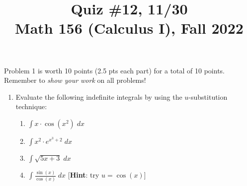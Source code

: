 \documentclass[11pt]{article}
\title{Quiz \#12, 11/30 \\ Math 156 (Calculus I), Fall 2022}
\date{}
\begin{document}
\maketitle

\thispagestyle{empty}

\vspace{-1cm}

Problem 1 is worth 10 points (2.5 pts each part) for a total of 10 points. Remember to \emph{show your work} on all problems!

\begin{enumerate}
\item Evaluate the following indefinite integrals by using the $u$-substitution technique:
\begin{enumerate}
\item $\int x\cdot \cos(x^2) \; dx$
\item $\int x^2 \cdot e^{x^3+2} \; dx$
\item $\int \sqrt{5x+3} \; dx$
\item $\int \frac{\sin(x)}{\cos(x)} \; dx$ \hfill [{\bf Hint}: try $u=\cos(x)$]
\end{enumerate}

\end{enumerate}
\end{document}
